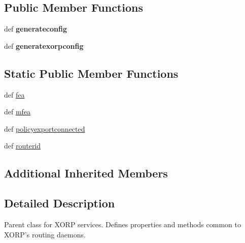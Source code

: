 \subsection*{Public Member Functions}
\begin{DoxyCompactItemize}
\item 
\hypertarget{classcore_1_1services_1_1xorp_1_1_xorp_service_a7bd32e686e5b9fbdc6a0feeb2e41d5b6}{def {\bfseries generateconfig}}\label{classcore_1_1services_1_1xorp_1_1_xorp_service_a7bd32e686e5b9fbdc6a0feeb2e41d5b6}

\item 
\hypertarget{classcore_1_1services_1_1xorp_1_1_xorp_service_a4d9bf3f3c8b11a3fd1bf4f49f5a82675}{def {\bfseries generatexorpconfig}}\label{classcore_1_1services_1_1xorp_1_1_xorp_service_a4d9bf3f3c8b11a3fd1bf4f49f5a82675}

\end{DoxyCompactItemize}
\subsection*{Static Public Member Functions}
\begin{DoxyCompactItemize}
\item 
def \hyperlink{classcore_1_1services_1_1xorp_1_1_xorp_service_a496e15d310c827ba58f7df0157f3b80f}{fea}
\item 
def \hyperlink{classcore_1_1services_1_1xorp_1_1_xorp_service_ae989b0daacad36328d933b3a60d0c5a9}{mfea}
\item 
def \hyperlink{classcore_1_1services_1_1xorp_1_1_xorp_service_ad2a58d48b6e64032e036eb2f77498fd8}{policyexportconnected}
\item 
def \hyperlink{classcore_1_1services_1_1xorp_1_1_xorp_service_afc2db4006f83b44caf99831868024644}{routerid}
\end{DoxyCompactItemize}
\subsection*{Additional Inherited Members}


\subsection{Detailed Description}
\begin{DoxyVerb}Parent class for XORP services. Defines properties and methods
    common to XORP's routing daemons.
\end{DoxyVerb}
 


